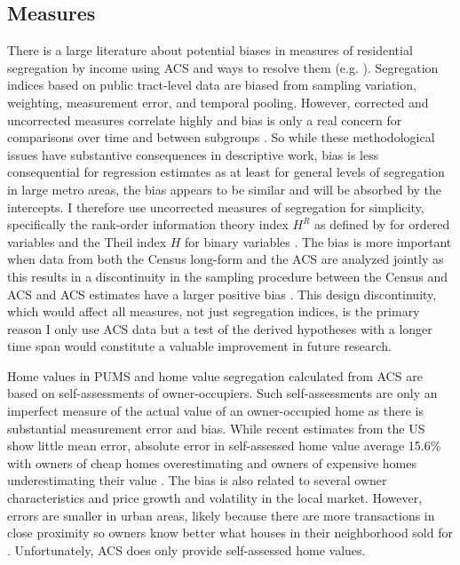 \subsection{Measures}

There is a large literature about potential biases in measures of residential segregation by income using ACS and ways to resolve them (e.g. \cite{loganIncomeSegregationWhom2020, leung-gagneItSurprisinglyDifficult2023}). Segregation indices based on public tract-level data are biased from sampling variation, weighting, measurement error, and temporal pooling. However, corrected and uncorrected measures correlate highly and bias is only a real concern for comparisons over time and between subgroups \citep[1972f]{loganIncomeSegregationWhom2020}. So while these methodological issues have substantive consequences in descriptive work, bias is less consequential for regression estimates as at least for general levels of segregation in large metro areas, the bias appears to be similar and will be absorbed by the intercepts. I therefore use uncorrected measures of segregation for simplicity, specifically the rank-order information theory index $H^R$ as defined by \citet{reardonNewApproachMeasuring2006} for ordered variables and the Theil index $H$ for binary variables \citep{reardonMeasuresMultigroupSegregation2002}. The bias is more important when data from both the Census long-form and the ACS are analyzed jointly as this results in a discontinuity in the sampling procedure between the Census and ACS and ACS estimates have a larger positive bias \citep{loganUptickIncomeSegregation2018}. This design discontinuity, which would affect all measures, not just segregation indices, is the primary reason I only use ACS data but a test of the derived hypotheses with a longer time span would constitute a valuable improvement in future research.

Home values in PUMS and home value segregation calculated from ACS are based on self-assessments of owner-occupiers. Such self-assessments are only an imperfect measure of the actual value of an owner-occupied home as there is substantial measurement error and bias. While recent estimates from the US show little mean error, absolute error in self-assessed home value average 15.6\% with owners of cheap homes overestimating and owners of expensive homes underestimating their value \citep{dreesenAccuracyHomeownersValuations2023}. The bias is also related to several owner characteristics and price growth and volatility in the local market. However, errors are smaller in urban areas, likely because there are more transactions in close proximity so owners know better what houses in their neighborhood sold for \citep{dreesenAccuracyHomeownersValuations2023}. Unfortunately, ACS does only provide self-assessed home values. 

